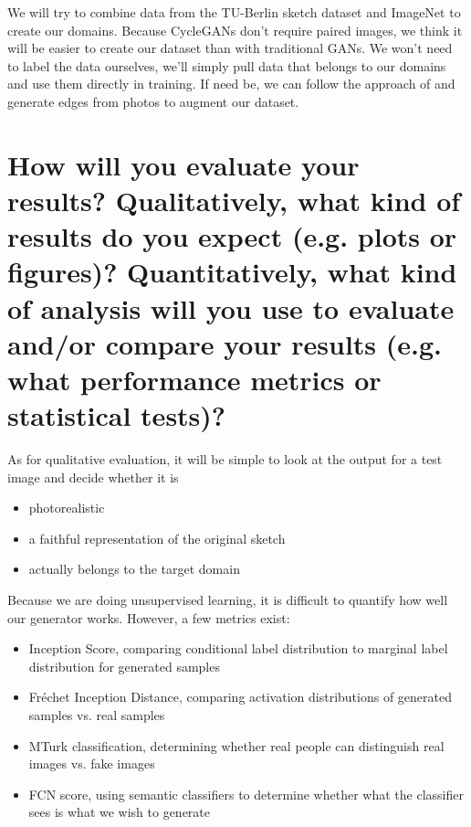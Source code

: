 \documentclass{article}
\begin{document}
We will try to combine data from the TU-Berlin sketch dataset \cite{tu-berlin-sketch} and ImageNet \cite{imagenet} to create our domains. 
Because CycleGANs don't require paired images, we think it will be easier to create our dataset than with traditional GANs.
We won't need to label the data ourselves, we'll simply pull data that belongs to our domains and use them directly in training.
If need be, we can follow the approach of \cite{pix2pix} and generate edges from photos to augment our dataset.

\section{How will you evaluate your results? Qualitatively, what kind of results do you expect (e.g. plots or figures)? Quantitatively, what kind of analysis will you use to evaluate and/or compare your results (e.g. what performance metrics or statistical tests)? }

As for qualitative evaluation, it will be simple to look at the output for a test image and decide whether it is 
\begin{itemize}
\item photorealistic
\item a faithful representation of the original sketch
\item actually belongs to the target domain
\end{itemize}

Because we are doing unsupervised learning, it is difficult to quantify how well our generator works. However, a few metrics exist:
\begin{itemize}
\item Inception Score, comparing conditional label distribution to marginal label distribution for generated samples
\item Fr\'echet Inception Distance, comparing activation distributions of generated samples vs. real samples
\item MTurk classification, determining whether real people can distinguish real images vs. fake images
\item FCN score, using semantic classifiers to determine whether what the classifier sees is what we wish to generate
\end{itemize}



\end{document}
